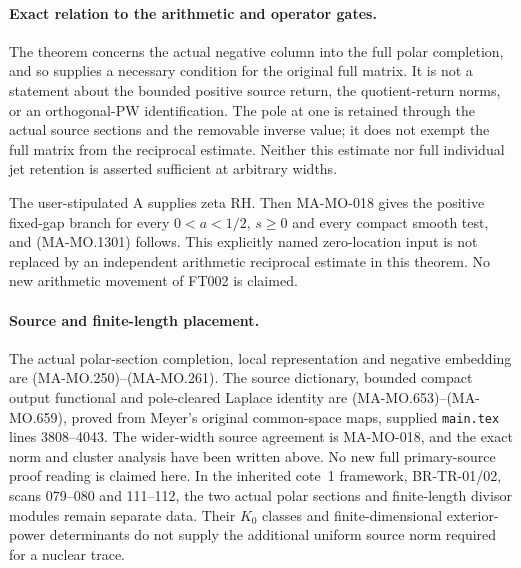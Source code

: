 \paragraph{Exact relation to the arithmetic and operator gates.}
The theorem concerns the actual negative column into the full
polar completion, and so supplies a necessary condition for the
original full matrix.  It is not a statement about the bounded
positive source return, the quotient-return norms, or an
orthogonal-PW identification.  The pole at one is retained through
the actual source sections and the removable inverse value; it
does not exempt the full matrix from the reciprocal estimate.
Neither this estimate nor full individual jet retention is
asserted sufficient at arbitrary widths.

The user-stipulated A supplies zeta RH.  Then MA-MO-018 gives
the positive fixed-gap branch for every $0<a<1/2$, $s\ge0$
and every compact smooth test, and (MA-MO.1301) follows.
This explicitly named zero-location input is not replaced by
an independent arithmetic reciprocal estimate in this theorem.
No new arithmetic movement of FT002 is claimed.

\paragraph{Source and finite-length placement.}
The actual polar-section completion, local representation and
negative embedding are (MA-MO.250)--(MA-MO.261).  The source
dictionary, bounded compact output functional and pole-cleared
Laplace identity are (MA-MO.653)--(MA-MO.659), proved from
Meyer's original common-space maps, supplied \texttt{main.tex}
lines 3808--4043.  The wider-width source agreement is MA-MO-018,
and the exact norm and cluster analysis have been written above.
No new full primary-source proof reading is claimed here.
In the inherited cote~1 framework, BR-TR-01/02, scans 079--080
and 111--112, the two actual polar sections and finite-length
divisor modules remain separate data.  Their $K_0$ classes and
finite-dimensional exterior-power determinants do not supply the
additional uniform source norm required for a nuclear trace.
